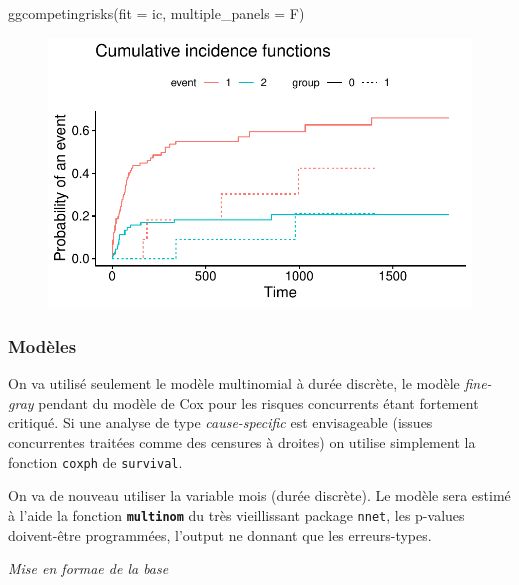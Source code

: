 \documentclass[
  12pt,
  letterpaper,
  DIV=11,
  numbers=noendperiod,
  onepage,
  openany]{scrreprt}
\newenvironment{Shaded}{\begin{snugshade}}{\end{snugshade}}
\newcommand{\AttributeTok}[1]{\textcolor[rgb]{0.80,0.80,0.80}{#1}}
\newcommand{\FunctionTok}[1]{\textcolor[rgb]{0.94,0.94,0.56}{#1}}
\newcommand{\NormalTok}[1]{\textcolor[rgb]{0.80,0.80,0.80}{#1}}
\begin{document}
\begin{Shaded}
\begin{Highlighting}[]
\FunctionTok{ggcompetingrisks}\NormalTok{(}\AttributeTok{fit =}\NormalTok{ ic, }\AttributeTok{multiple\_panels =}\NormalTok{ F)}
\end{Highlighting}
\end{Shaded}

\begin{figure}[H]

{\centering \includegraphics{14-R_files/figure-pdf/unnamed-chunk-45-2.pdf}

}

\end{figure}

\hypertarget{moduxe8les-1}{%
\subsubsection{\texorpdfstring{\textbf{Modèles}}{Modèles}}\label{moduxe8les-1}}

On va utilisé seulement le modèle multinomial à durée discrète, le
modèle \emph{fine-gray} pendant du modèle de Cox pour les risques
concurrents étant fortement critiqué. Si une analyse de type
\emph{cause-specific} est envisageable (issues concurrentes traitées
comme des censures à droites) on utilise simplement la fonction
\texttt{coxph} de \texttt{survival}.

On va de nouveau utiliser la variable mois (durée discrète). Le modèle
sera estimé à l'aide la fonction \textbf{\texttt{multinom}} du très
vieillissant package \texttt{nnet}, les p-values doivent-être
programmées, l'output ne donnant que les erreurs-types.

\emph{Mise en formae de la base}
\end{document}
